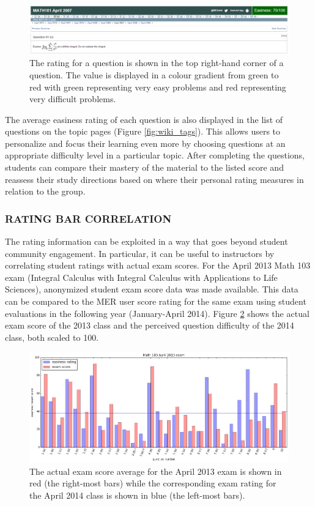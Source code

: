 \documentclass{primus}
\begin{document}
\begin{figure}[H]
\centering
\includegraphics[width=\textwidth]{figs/easiness_rating.jpg}
\caption{The rating for a question is shown in the top right-hand corner of a question. The value is displayed in a colour gradient from green to red with green representing very easy problems and red representing very difficult problems.}\label{fig:Rating_bar}
\end{figure}

\noindent{}The average easiness rating of each question is also displayed in the list of questions on the topic pages (Figure \ref{fig:wiki_tags}). This allows users to personalize and focus their learning even more by choosing questions at an appropriate difficulty level in a particular topic. After completing the questions, students can compare their mastery of the material to the listed score and reassess their study directions based on where their personal rating measures in relation to the group.

\subsubsection{RATING BAR CORRELATION}\label{sec:correlation}
The rating information can be exploited in a way that goes beyond student community engagement. In particular, it can be useful to instructors by correlating student ratings with actual exam scores. For the April 2013 Math 103 exam (Integral Calculus with Integral Calculus with Applications to Life Sciences), anonymized student exam score data was made available. This data can be compared to the MER user score rating for the same exam using student evaluations in the following year (January-April 2014). Figure \ref{fig:score_compare} shows the actual exam score of the 2013 class and the perceived question difficulty of the 2014 class, both scaled to 100.

\begin{figure}[H]
\centering
\includegraphics[width=\textwidth]{figs/score_compare.png}
\caption{The actual exam score average for the April 2013 exam is shown in red (the right-most bars) while the corresponding exam rating for the April 2014 class is shown in blue (the left-most bars).}\label{fig:score_compare}
\end{figure}
\end{document}
